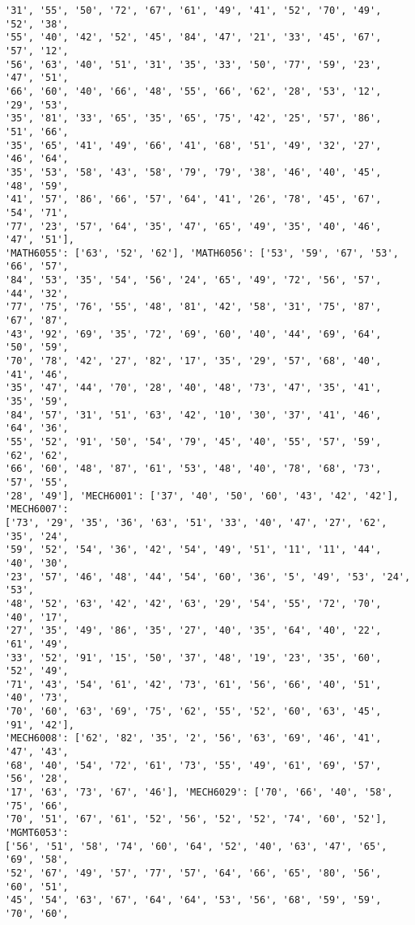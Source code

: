 \documentclass[11pt]{article}
\begin{document}
\begin{Verbatim}[commandchars=\\\{\}]
'31', '55', '50', '72', '67', '61', '49', '41', '52', '70', '49', '52', '38',
'55', '40', '42', '52', '45', '84', '47', '21', '33', '45', '67', '57', '12',
'56', '63', '40', '51', '31', '35', '33', '50', '77', '59', '23', '47', '51',
'66', '60', '40', '66', '48', '55', '66', '62', '28', '53', '12', '29', '53',
'35', '81', '33', '65', '35', '65', '75', '42', '25', '57', '86', '51', '66',
'35', '65', '41', '49', '66', '41', '68', '51', '49', '32', '27', '46', '64',
'35', '53', '58', '43', '58', '79', '79', '38', '46', '40', '45', '48', '59',
'41', '57', '86', '66', '57', '64', '41', '26', '78', '45', '67', '54', '71',
'77', '23', '57', '64', '35', '47', '65', '49', '35', '40', '46', '47', '51'],
'MATH6055': ['63', '52', '62'], 'MATH6056': ['53', '59', '67', '53', '66', '57',
'84', '53', '35', '54', '56', '24', '65', '49', '72', '56', '57', '44', '32',
'77', '75', '76', '55', '48', '81', '42', '58', '31', '75', '87', '67', '87',
'43', '92', '69', '35', '72', '69', '60', '40', '44', '69', '64', '50', '59',
'70', '78', '42', '27', '82', '17', '35', '29', '57', '68', '40', '41', '46',
'35', '47', '44', '70', '28', '40', '48', '73', '47', '35', '41', '35', '59',
'84', '57', '31', '51', '63', '42', '10', '30', '37', '41', '46', '64', '36',
'55', '52', '91', '50', '54', '79', '45', '40', '55', '57', '59', '62', '62',
'66', '60', '48', '87', '61', '53', '48', '40', '78', '68', '73', '57', '55',
'28', '49'], 'MECH6001': ['37', '40', '50', '60', '43', '42', '42'], 'MECH6007':
['73', '29', '35', '36', '63', '51', '33', '40', '47', '27', '62', '35', '24',
'59', '52', '54', '36', '42', '54', '49', '51', '11', '11', '44', '40', '30',
'23', '57', '46', '48', '44', '54', '60', '36', '5', '49', '53', '24', '53',
'48', '52', '63', '42', '42', '63', '29', '54', '55', '72', '70', '40', '17',
'27', '35', '49', '86', '35', '27', '40', '35', '64', '40', '22', '61', '49',
'33', '52', '91', '15', '50', '37', '48', '19', '23', '35', '60', '52', '49',
'71', '43', '54', '61', '42', '73', '61', '56', '66', '40', '51', '40', '73',
'70', '60', '63', '69', '75', '62', '55', '52', '60', '63', '45', '91', '42'],
'MECH6008': ['62', '82', '35', '2', '56', '63', '69', '46', '41', '47', '43',
'68', '40', '54', '72', '61', '73', '55', '49', '61', '69', '57', '56', '28',
'17', '63', '73', '67', '46'], 'MECH6029': ['70', '66', '40', '58', '75', '66',
'70', '51', '67', '61', '52', '56', '52', '52', '74', '60', '52'], 'MGMT6053':
['56', '51', '58', '74', '60', '64', '52', '40', '63', '47', '65', '69', '58',
'52', '67', '49', '57', '77', '57', '64', '66', '65', '80', '56', '60', '51',
'45', '54', '63', '67', '64', '64', '53', '56', '68', '59', '59', '70', '60',

\end{Verbatim}
\end{document}
